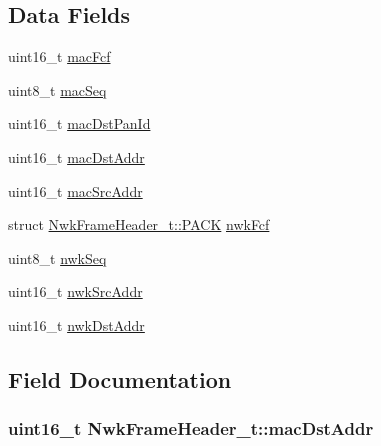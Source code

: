 \subsection*{Data Fields}
\begin{DoxyCompactItemize}
\item 
uint16\-\_\-t \hyperlink{struct_nwk_frame_header__t_a136fb8b5fae16dc89aa581578163a292}{mac\-Fcf}
\item 
uint8\-\_\-t \hyperlink{struct_nwk_frame_header__t_a1a2af294d7235b16d1bff5050fe8c24d}{mac\-Seq}
\item 
uint16\-\_\-t \hyperlink{struct_nwk_frame_header__t_a503c00407e350a489337324ea735f421}{mac\-Dst\-Pan\-Id}
\item 
uint16\-\_\-t \hyperlink{struct_nwk_frame_header__t_a52eaa8a2d2442746a409f26742205433}{mac\-Dst\-Addr}
\item 
uint16\-\_\-t \hyperlink{struct_nwk_frame_header__t_a8648deb85dac8f29a2109e0e430b1be3}{mac\-Src\-Addr}
\item 
struct \hyperlink{sys_types_8h_a085f543ccded0731c1191e9c76a27311}{Nwk\-Frame\-Header\-\_\-t\-::\-P\-A\-C\-K} \hyperlink{struct_nwk_frame_header__t_a0db7c5ebd8f56586b41063be79f69d5a}{nwk\-Fcf}
\item 
uint8\-\_\-t \hyperlink{struct_nwk_frame_header__t_a198e5b4ebb92d3b58b38dfa6a1a836e4}{nwk\-Seq}
\item 
uint16\-\_\-t \hyperlink{struct_nwk_frame_header__t_a4e62b8b0c4a47f8fc152f3f5e05db61a}{nwk\-Src\-Addr}
\item 
uint16\-\_\-t \hyperlink{struct_nwk_frame_header__t_a73226e1cb8813883d7c5ce8e9bf7ef40}{nwk\-Dst\-Addr}
\end{DoxyCompactItemize}


\subsection{Field Documentation}
\hypertarget{struct_nwk_frame_header__t_a52eaa8a2d2442746a409f26742205433}{
\subsubsection[{mac\-Dst\-Addr}]{\setlength{\rightskip}{0pt plus 5cm}uint16\-\_\-t Nwk\-Frame\-Header\-\_\-t\-::mac\-Dst\-Addr}}\label{struct_nwk_frame_header__t_a52eaa8a2d2442746a409f26742205433}


